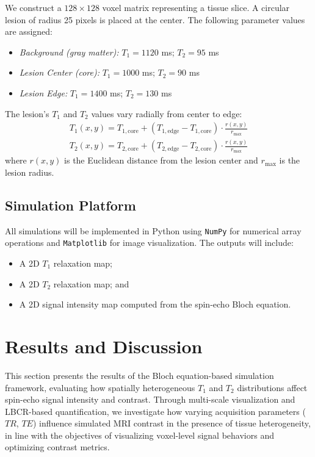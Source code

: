\documentclass[10pt,a4paper,twoside]{article}
\begin{document}
\begin{enumerate}
We construct a \(128 \times 128\) voxel matrix representing a tissue slice. A circular lesion of radius 25 pixels is placed at the center. The following parameter values are assigned:

\begin{itemize}
    \item \textit{Background (gray matter):} \(T_1 = 1120\) ms; \(T_2 = 95\) ms
    \item \textit{Lesion Center (core):} \(T_1 = 1000\) ms; \(T_2 = 90\) ms
    \item \textit{Lesion Edge:} \(T_1 = 1400\) ms; \(T_2 = 130\) ms
\end{itemize}

\noindent The lesion's \(T_1\) and \(T_2\) values vary radially from center to edge:
\begin{align}
    T_1(x, y) = T_{1,\text{core}} + \left( T_{1,\text{edge}} - T_{1,\text{core}} \right) \cdot \frac{r(x, y)}{r_{\max}} \\
    T_2(x, y) = T_{2,\text{core}} + \left( T_{2,\text{edge}} - T_{2,\text{core}} \right) \cdot \frac{r(x, y)}{r_{\max}}
\end{align}
where \( r(x, y) \) is the Euclidean distance from the lesion center and \( r_{\max} \) is the lesion radius.

\subsection{Simulation Platform}

All simulations will be implemented in Python using \texttt{NumPy} for numerical array operations and \texttt{Matplotlib} for image visualization. The outputs will include:
\begin{itemize}
    \item A 2D \(T_1\) relaxation map;
    \item A 2D \(T_2\) relaxation map; and
    \item A 2D signal intensity map computed from the spin-echo Bloch equation.
\end{itemize}

\section{Results and Discussion}\label{sec:rnd}

This section presents the results of the Bloch equation-based simulation framework, evaluating how spatially heterogeneous \( T_1 \) and \( T_2 \) distributions affect spin-echo signal intensity and contrast. Through multi-scale visualization and LBCR-based quantification, we investigate how varying acquisition parameters (\( TR \), \( TE \)) influence simulated MRI contrast in the presence of tissue heterogeneity, in line with the objectives of visualizing voxel-level signal behaviors and optimizing contrast metrics.


\end{enumerate}
\end{document}
